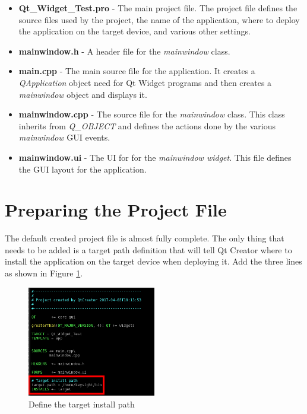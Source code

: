 \documentclass{article}
\begin{document}
\begin{itemize}
	\item \textbf{Qt\_Widget\_Test.pro} - The main project file. The project file defines the source files used by the project, the name of the application, where to deploy the application on the target device, and various other settings.
	
	\item \textbf{mainwindow.h} - A header file for the \textit{mainwindow} class. 
	
	\item \textbf{main.cpp} - The main source file for the application. It creates a \textit{QApplication} object need for Qt Widget programs and then creates a \textit{mainwindow} object and displays it.
	
	\item \textbf{mainwindow.cpp} - The source file for the \textit{mainwindow} class. This class inherits from \textit{Q\_OBJECT} and defines the actions done by the various \textit{mainwindow} GUI events.
	
	\item \textbf{mainwindow.ui} - The UI for for the \textit{mainwindow widget}. This file defines the GUI layout for the application.
\end{itemize}


\section{Preparing the Project File}

The default created project file is almost fully complete. The only thing that needs to be added is a target path definition that will tell Qt Creator where to install the application on the target device when deploying it. Add the three lines as shown in Figure \ref{Target_Path}.

	\begin{figure}[H]
		\centering
		\includegraphics[width=0.5\textwidth]{pics/Add_Target.png}
		\caption{Define the target install path}
		\label{Target_Path}
	\end{figure}
\end{document}
